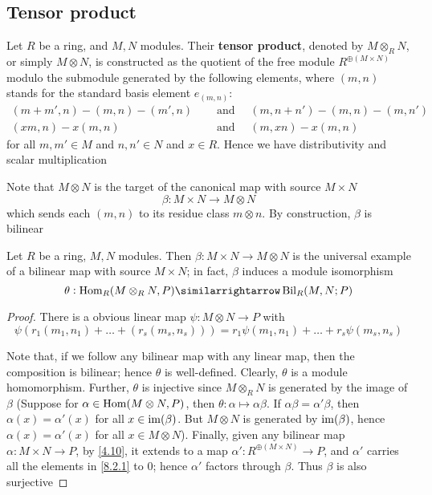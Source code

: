 \documentclass[11pt]{article}
\begin{document}
\subsection*{Tensor product}
\label{sec:org55415a0}
Let \(R\) be a ring, and \(M,N\) modules. Their \textbf{tensor product}, denoted by
\(M\otimes_R N\), or simply \(M\otimes N\), is constructed as the quotient of
the free module \(R^{\oplus(M\times N)}\) modulo the submodule generated by
the following elements, where \((m,n)\) stands for the standard basis element
\(e_{(m,n)}\):
\begin{align}
(m+m',n)-(m,n)-(m',n)\quad&\text{ and }\quad
(m,n+n')-(m,n)-(m,n')   \label{8.2.1}\\
(xm,n)-x(m,n)\quad&\text{ and }\quad
(m,xn)-x(m,n)\nonumber
\end{align}
for all \(m,m'\in M\) and \(n,n'\in N\) and \(x\in R\). Hence we have
distributivity and scalar multiplication

Note that \(M\otimes N\) is the target of the canonical map with source
\(M\times N\)
\begin{equation*}
\beta:M\times N\to M\otimes N
\end{equation*}
which sends each \((m,n)\) to its residue class \(m\otimes n\). By
construction, \(\beta\) is bilinear

\begin{theorem}
Let \(R\) be a ring, \(M,N\) modules. Then \(\beta:M\times N\to M\otimes N\) is
the universal example of a bilinear map with source \(M\times N\); in fact, \(\beta\)
induces a module isomorphism
\begin{equation*}
\theta:\Hom_R(M\otimes_R N,P)\similarrightarrow\Bil_R(M,N;P)
\end{equation*}
\end{theorem}

\begin{proof}
There is a obvious linear map \(\psi:M\otimes N\to P\) with
\begin{equation*}
\psi(r_1(m_1,n_1)+\dots+(r_s(m_s,n_s)))=r_1\psi(m_1,n_1)+\dots+r_s\psi(m_s,n_s)
\end{equation*}


Note that, if we follow any bilinear map with any linear map, then the
composition is bilinear; hence \(\theta\) is well-defined. Clearly, \(\theta\) is a module
homomorphism. Further, \(\theta\) is injective since \(M\otimes_R N\) is generated by
the image of \(\beta\) (Suppose for \(\alpha\in\operatorname{Hom}(M\otimes N,P)\), then
\(\theta:\alpha\mapsto \alpha\beta\). If \(\alpha\beta=\alpha'\beta\), then
\(\alpha(x)=\alpha'(x)\) for all \(x\in\operatorname{im}(\beta)\). But \(M\otimes N\) is generated
by \(\operatorname{im}(\beta)\), hence \(\alpha(x)=\alpha'(x)\) for all \(x\in M\otimes N\)).
Finally, given any bilinear map \(\alpha:M\times N\to P\), by
\ref{4.10}, it extends to a map \(\alpha':R^{\oplus(M\times N)}\to P\), and
\(\alpha'\) carries all the elements in \eqref{8.2.1} to 0; hence \(\alpha'\)
factors through \(\beta\). Thus \(\beta\) is also surjective
\end{proof}
\end{document}
